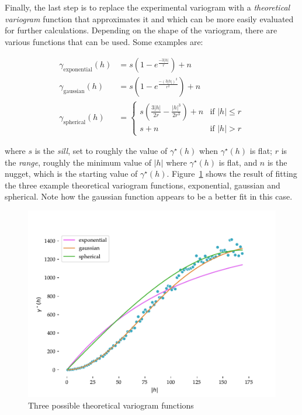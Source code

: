 Finally, the last step is to replace the experimental variogram with a \emph{theoretical variogram} function that approximates it and which can be more easily evaluated for further calculations.
Depending on the shape of the variogram, there are various functions that can be used.
Some examples are:

\begin{align}
\gamma_\mathrm{exponential}(h) &= s \left(1 - e^\frac{-3|h|}{r}\right) + n \\
\gamma_\mathrm{gaussian}(h) &= s \left(1 - e^\frac{-\left(3|h|\right)^2}{r^2}\right) + n \\
\gamma_\mathrm{spherical}(h) &= \begin{cases} 
   s \left(\frac{3|h|}{2r} - \frac{|h|^3}{2r^3}\right) + n & \text{if } |h| \leq r \\
   s + n & \text{if } |h| > r
  \end{cases}
\end{align}

where \(s\) is the \emph{sill}, set to roughly the value of \(\gamma^\star(h)\) when \(\gamma^\star(h)\) is  flat; \(r\) is the \emph{range}, roughly the minimum value of \(|h|\) where \(\gamma^\star(h)\) is flat, and \(n\) is the nugget, which is the starting value of \(\gamma^\star(h)\).
Figure~\ref{fig:theoretical_variogram} shows the result of fitting the three example theoretical variogram functions, exponential, gaussian and spherical.
Note how the gaussian function appears to be a better fit in this case.

\begin{figure}[htbp]
\centering
\includegraphics[width=0.5\linewidth]{figs/theoretical_variogram}
\caption{Three possible theoretical variogram functions}%
\label{fig:theoretical_variogram}
\end{figure}


